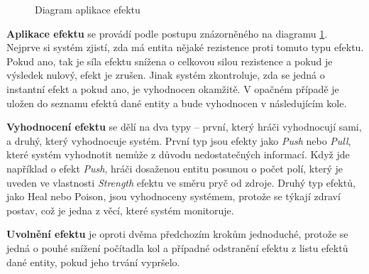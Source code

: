 \begin{figure}[H]
    \centering
    \caption{Diagram aplikace efektu}
    \label{diag:apply_effect}
\end{figure}

\textbf{Aplikace efektu} se provádí podle postupu znázorněného na diagramu \ref{diag:apply_effect}. Nejprve si systém zjistí, zda má entita nějaké rezistence proti tomuto typu efektu. Pokud ano, tak je síla efektu snížena o celkovou silou rezistence a pokud je výsledek nulový, efekt je zrušen. Jinak systém zkontroluje, zda se jedná o instantní efekt a pokud ano, je vyhodnocen okamžitě. V opačném případě je uložen do seznamu efektů dané entity a bude vyhodnocen v následujícím kole.

\textbf{Vyhodnocení efektu} se dělí na dva typy -- první, který hráči vyhodnocují sami, a druhý, který vyhodnocuje systém. První typ jsou efekty jako \textit{Push} nebo \textit{Pull}, které systém vyhodnotit nemůže z důvodu nedostatečných informací. Když jde například o efekt \textit{Push}, hráči dosaženou entitu posunou o počet polí, který je uveden ve vlastnosti \textit{Strength} efektu ve směru pryč od zdroje. Druhý typ efektů, jako Heal nebo Poison, jsou vyhodnoceny systémem, protože se týkají zdraví postav, což je jedna z věcí, které systém monitoruje. 

\textbf{Uvolnění efektu} je oproti dvěma předchozím krokům jednoduché, protože se jedná o pouhé snížení počítadla kol a případné odstranění efektu z listu efektů dané entity, pokud jeho trvání vypršelo.
